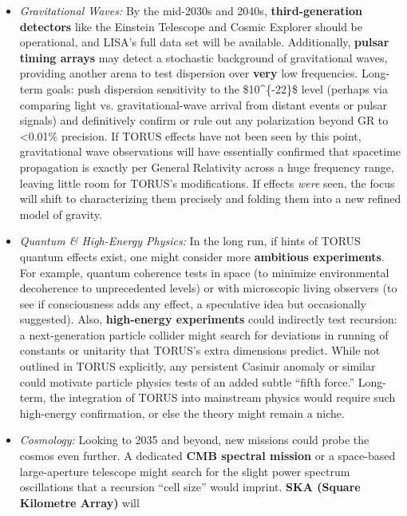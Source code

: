 \documentclass[]{article}
\begin{document}
{\begin{itemize}
  \begin{itemize}
  \item
    \emph{Gravitational Waves:} By the mid-2030s and 2040s,
    \textbf{third-generation detectors} like the Einstein Telescope and
    Cosmic Explorer should be operational, and LISA's full data set will
    be available. Additionally, \textbf{pulsar timing arrays} may detect
    a stochastic background of gravitational waves, providing another
    arena to test dispersion over \textbf{very} low frequencies.
    Long-term goals: push dispersion sensitivity to the
    \$10\^{}\{-22\}\$ level (perhaps via comparing light vs.
    gravitational-wave arrival from distant events or pulsar signals)
    and definitively confirm or rule out any polarization beyond GR to
    \textless{}0.01\% precision. If TORUS effects have not been seen by
    this point, gravitational wave observations will have essentially
    confirmed that spacetime propagation is exactly per General
    Relativity across a huge frequency range, leaving little room for
    TORUS's modifications. If effects \emph{were} seen, the focus will
    shift to characterizing them precisely and folding them into a new
    refined model of gravity.
  \item
    \emph{Quantum \& High-Energy Physics:} In the long run, if hints of
    TORUS quantum effects exist, one might consider more
    \textbf{ambitious experiments}. For example, quantum coherence tests
    in space (to minimize environmental decoherence to unprecedented
    levels) or with microscopic living observers (to see if
    consciousness adds any effect, a speculative idea but occasionally
    suggested). Also, \textbf{high-energy experiments} could indirectly
    test recursion: a next-generation particle collider might search for
    deviations in running of constants or unitarity that TORUS's extra
    dimensions predict. While not outlined in TORUS explicitly, any
    persistent Casimir anomaly or similar could motivate particle
    physics tests of an added subtle ``fifth force.'' Long-term, the
    integration of TORUS into mainstream physics would require such
    high-energy confirmation, or else the theory might remain a niche.
  \item
    \emph{Cosmology:} Looking to 2035 and beyond, new missions could
    probe the cosmos even further. A dedicated \textbf{CMB spectral
    mission} or a space-based large-aperture telescope might search for
    the slight power spectrum oscillations that a recursion ``cell
    size'' would imprint​. \textbf{SKA (Square Kilometre Array)} will

\end{itemize}
\end{itemize}}
\end{document}
